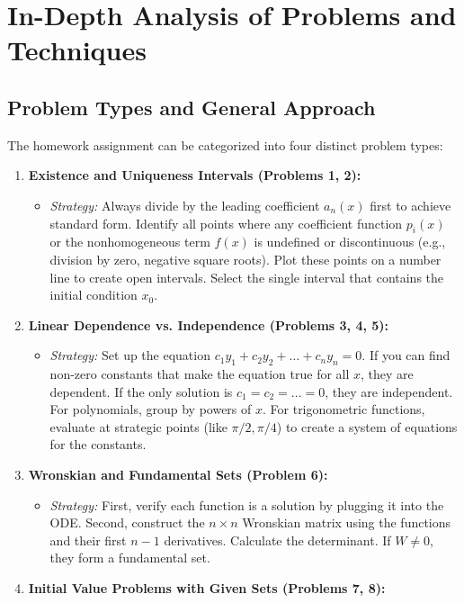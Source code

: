 \documentclass[11pt, a4paper]{article}
\theoremstyle{definition}
\theoremstyle{remark}
\begin{document}
\newpage
\section{In-Depth Analysis of Problems and Techniques}

\subsection{Problem Types and General Approach}
The homework assignment can be categorized into four distinct problem types:
\begin{enumerate}
    \item \textbf{Existence and Uniqueness Intervals (Problems 1, 2):}
    \begin{itemize}
        \item \textit{Strategy:} Always divide by the leading coefficient $a_n(x)$ first to achieve standard form. Identify all points where any coefficient function $p_i(x)$ or the nonhomogeneous term $f(x)$ is undefined or discontinuous (e.g., division by zero, negative square roots). Plot these points on a number line to create open intervals. Select the single interval that contains the initial condition $x_0$.
    \end{itemize}
    \item \textbf{Linear Dependence vs. Independence (Problems 3, 4, 5):}
    \begin{itemize}
        \item \textit{Strategy:} Set up the equation $c_1 y_1 + c_2 y_2 + \dots + c_n y_n = 0$. If you can find non-zero constants that make the equation true for all $x$, they are dependent. If the only solution is $c_1 = c_2 = \dots = 0$, they are independent. For polynomials, group by powers of $x$. For trigonometric functions, evaluate at strategic points (like $\pi/2, \pi/4$) to create a system of equations for the constants.
    \end{itemize}
    \item \textbf{Wronskian and Fundamental Sets (Problem 6):}
    \begin{itemize}
        \item \textit{Strategy:} First, verify each function is a solution by plugging it into the ODE. Second, construct the $n \times n$ Wronskian matrix using the functions and their first $n-1$ derivatives. Calculate the determinant. If $W \neq 0$, they form a fundamental set.
    \end{itemize}
    \item \textbf{Initial Value Problems with Given Sets (Problems 7, 8):}

\end{enumerate}
\end{document}
